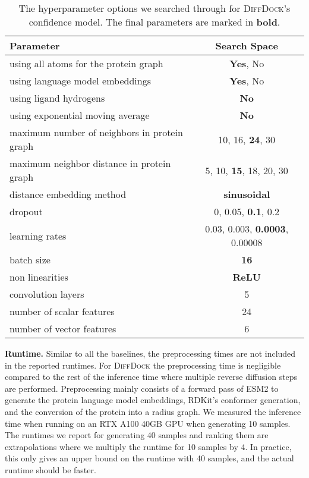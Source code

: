 \documentclass{article} \usepackage{iclr2023_conference,times}
\begin{document}
\begin{table}[htpb]
\caption[SearchSpace]{The hyperparameter options we searched through for \textsc{DiffDock}'s confidence model. The final parameters are marked in \textbf{bold}.}
\label{tab:hyperparameters_confidence_model}
\begin{center}
\begin{small}
\begin{sc}
\begin{tabular}{lc}
\toprule
Parameter & Search Space  \\    
\midrule
using all atoms for the protein graph & \textbf{Yes}, {No}\\
using language model embeddings & \textbf{Yes}, No\\
using ligand hydrogens & \textbf{No}\\
using exponential moving average & \textbf{No}\\
maximum number of neighbors in protein graph & 10, 16, \textbf{24}, 30\\
maximum neighbor distance in protein graph & 5, 10, \textbf{15}, 18, 20, 30\\
distance embedding method & \textbf{sinusoidal} \\
dropout & 0, 0.05, \textbf{0.1}, 0.2 \\
learning rates & 0.03, 0.003, \textbf{0.0003}, 0.00008\\
batch size & \textbf{16}\\
non linearities & \textbf{ReLU} \\
\midrule
convolution layers & 5 \\
number of scalar features &  24 \\
number of vector features &  6 \\
\bottomrule
\end{tabular}
\end{sc}
\end{small}
\end{center}
\vskip -0.1in
\end{table}

 


\textbf{Runtime.} Similar to all the baselines, the preprocessing times are not included in the reported runtimes. For \textsc{DiffDock} the preprocessing time is negligible compared to the rest of the inference time where multiple reverse diffusion steps are performed. Preprocessing mainly consists of a forward pass of ESM2 to generate the protein language model embeddings, RDKit's conformer generation, and the conversion of the protein into a radius graph. We measured the inference time when running on an RTX A100 40GB GPU when generating 10 samples. The runtimes we report for generating 40 samples and ranking them are extrapolations where we multiply the runtime for 10 samples by 4. In practice, this only gives an upper bound on the runtime with 40 samples, and the actual runtime should be faster. 
\end{document}
